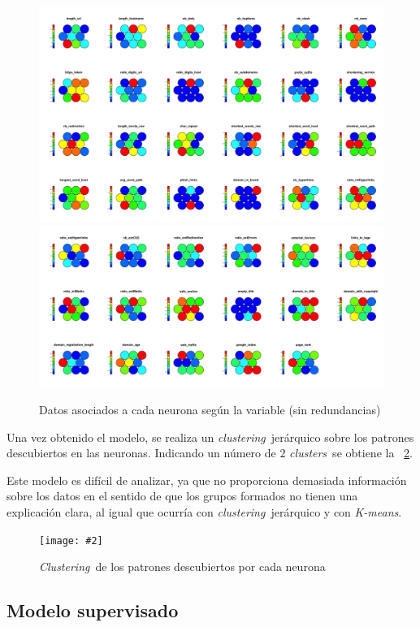 \documentclass[12pt, a4paper]{article}
\renewcommand{\textit}{\textsl}
\newcommand*{\figref}[1]{\figurename~\ref{fig:#1}}
\newcommand{\figcaption}[4][H]{
  \begin{figure}[#1]
    \centering
    \texttt{[image: \#2]}
    \caption{#3}
    \label{fig:#2}
  \end{figure}
}
\newcommand*{\clusters}{\textit{clusters}}
\newcommand*{\clustering}{\textit{clustering}}
\newcommand*{\Clustering}{\textit{Clustering}}
\newcommand*{\kmeans}{\textit{K-means}}
\begin{document}
      \begin{figure}[H]
        \centering
        \includegraphics[width=1\textwidth]{maps1_nr.png}
        \includegraphics[width=1\textwidth]{maps2_nr.png}
        \caption{Datos asociados a cada neurona según la variable (sin redundancias)}
        \label{fig:maps_nr.png}
      \end{figure}

      Una vez obtenido el modelo, se realiza un \clustering\ jerárquico sobre los patrones descubiertos en las neuronas. Indicando un número de $2$ \clusters\ se obtiene la \figref{cluster_som.png}.

      Este modelo es difícil de analizar, ya que no proporciona demasiada información sobre los datos en el sentido de que los grupos formados no tienen una explicación clara, al igual que ocurría con \clustering\ jerárquico y con \kmeans.

      \figcaption{cluster_som.png}{\Clustering\ de los patrones descubiertos por cada neurona}{1}

    \subsection{Modelo supervisado}
\end{document}
